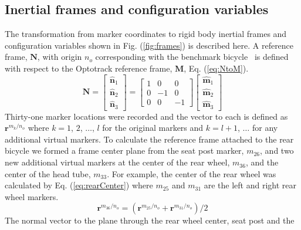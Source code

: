 
\begin{appendices}
\section{Inertial frames and configuration variables}
\label{sec:inFrames}
The transformation from marker coordinates to rigid body inertial frames and
configuration variables shown in Fig. (\ref{fig:frames}) is described here. A
reference frame, $\mathbf{N}$, with origin $n_o$ corresponding with the
benchmark bicycle~\cite{Meijaard2007} is defined with respect to the Optotrack
reference frame, $\mathbf{M}$, Eq. (\ref{eq:NtoM}).
\begin{equation}
    \mathbf{N}=
    \left[
    \begin{array}{c}
    \hat{\mathbf{n}}_1\\
    \hat{\mathbf{n}}_2\\
    \hat{\mathbf{n}}_3
  \end{array}
    \right]
    =
    \left[
    \begin{array}{rrr}
    1 &  0 &  0\\
    0 & -1 &  0\\
    0 &  0 & -1
    \end{array}
    \right]
    \left[
    \begin{array}{c}
    \hat{\mathbf{m}}_1\\
    \hat{\mathbf{m}}_2\\
    \hat{\mathbf{m}}_3
  \end{array}
    \right]
\label{eq:NtoM}
\end{equation}
Thirty-one marker locations were recorded and the vector to each is defined as
$\mathbf{r}^{{m_{k}}/{n_o}}$ where $k=1$, $2$, $\ldots$, $l$ for the original
markers and $k=l+1$, $\ldots$ for any additional virtual markers.  To calculate
the reference frame attached to the rear bicycle we formed a frame center plane
from the seat post marker, $m_{26}$, and two new additional virtual markers at
the center of the rear wheel, $m_{36}$, and the center of the head tube,
$m_{33}$. For example, the center of the rear wheel was calculated by Eq.
(\ref{eq:rearCenter}) where $m_{25}$ and $m_{31}$ are the left and right rear
wheel markers.
\begin{equation}
    \mathbf{r}^{{m_{36}}/{n_o}}=(\mathbf{r}^{{m_{25}}/{n_o}}+\mathbf{r}^{{m_{31}}/{n_o}})/2
\label{eq:rearCenter}
\end{equation}
The normal vector to the plane through the rear wheel center, seat post and the

\end{appendices}
